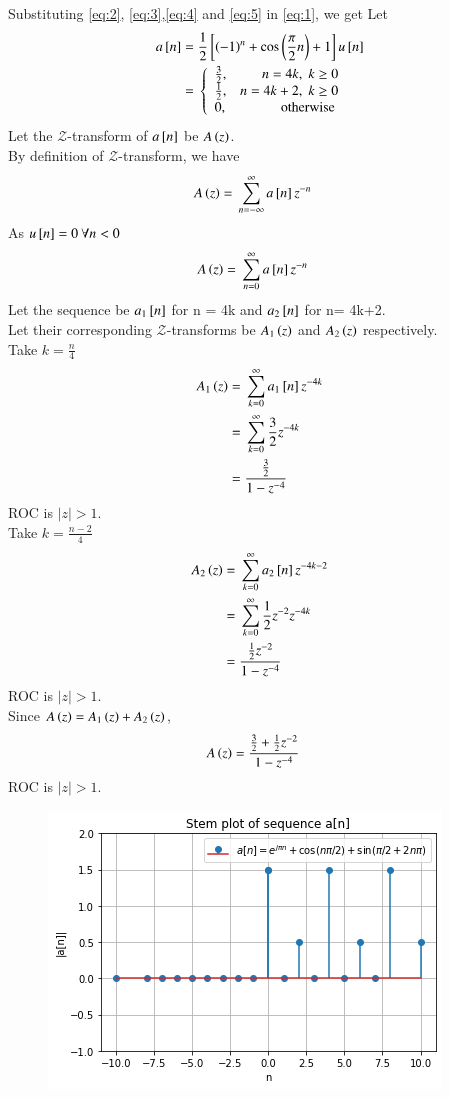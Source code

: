\documentclass[journal,12pt,twocolumn]{IEEEtran}
\begin{document}
Substituting \eqref{eq:2}, \eqref{eq:3},\eqref{eq:4} and \eqref{eq:5} in \eqref{eq:1}, we get 
Let 
\begin{align}
\label{eq:6}
a{}\left[n\right] ={}& \frac{1}{2}{}\left[\left(-1\right)^{n} + \cos\left(\frac{\pi}{2} n\right) + 1\right]u{}\left[n\right]\\
\label{eq:7}
={}& \left\{
  \begin{array}{lr} 
      \frac{3}{2}, & n = 4k,\; k\geq 0 \\
      \frac{1}{2}, & n = 4k+2,\; k \geq 0 \\
      0, & \text{ otherwise }
      \end{array}
\right.
\end{align}
Let the $\mathcal{Z}$-transform of $a{}\left[n\right]$ be $A\left(z\right)$.\\
By definition of $\mathcal{Z}$-transform, we have
\begin{align}
\label{eq:8}
A\left(z\right)={}& \sum_{n=-\infty}^\infty a{}\left[n\right]z^{-n}
\end{align}
As $u{}\left[n\right] = 0\: \forall n< 0$
\begin{align}
\label{eq:9}
A\left(z\right)={}& \sum_{n=0}^\infty a{}\left[n\right]z^{-n}
\end{align}
Let the sequence be $a_{1}{}\left[n\right]$ for n = 4k and $a_{2}{}\left[n\right]$ for n= 4k+2. \\
Let their corresponding $\mathcal{Z}$-transforms be $A_{1}\left(z\right)$ and $A_{2}\left(z\right)$ respectively.\\
Take $k=\frac{n}{4}$
\begin{align}
\label{eq:10}
A_{1}\left(z\right) = {}& \sum_{k=0}^\infty a_{1}{}\left[n\right]z^{-4k}\\
\label{eq:11}
={}& \sum_{k=0}^\infty \frac{3}{2}z^{-4k}\\
\label{eq:12}
={}& \frac{\frac{3}{2}}{1-z^{-4}}
\end{align}
ROC is $|z|>1$.\\
Take $k=\frac{n-2}{4}$
\begin{align}
\label{eq:13}
A_{2}\left(z\right) = {}& \sum_{k=0}^\infty a_{2}{}\left[n\right]z^{-4k-2}\\
\label{eq:14}
={}& \sum_{k=0}^\infty \frac{1}{2}z^{-2}z^{-4k}\\
\label{eq:15}
={}& \frac{\frac{1}{2}z^{-2}}{1-z^{-4}}
\end{align}
ROC is $|z|>1$.\\
Since $A\left(z\right)= A_{1}\left(z\right) + A_{2}\left(z\right)$,
\begin{align}
A\left(z\right) ={}& \frac{\frac{3}{2}+\frac{1}{2}z^{-2}}{1-z^{-4}}
\end{align}
ROC is $|z|>1$.
\begin{figure}[h]
\centering
\includegraphics[width = \columnwidth]{q2_quiz2}
\end{figure}
\end{document}
